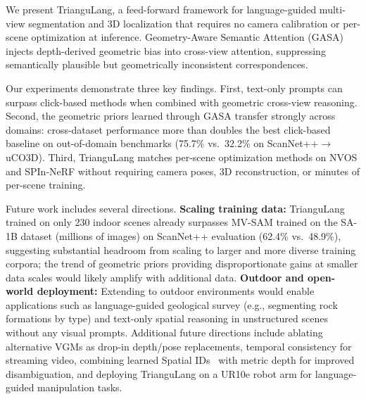 \label{sec:conclusion}
We present TrianguLang, a feed-forward framework for language-guided multi-view segmentation and 3D localization that requires no camera calibration or per-scene optimization at inference. Geometry-Aware Semantic Attention (GASA) injects depth-derived geometric bias into cross-view attention, suppressing semantically plausible but geometrically inconsistent correspondences.

Our experiments demonstrate three key findings. First, text-only prompts can surpass click-based methods when combined with geometric cross-view reasoning. Second, the geometric priors learned through GASA transfer strongly across domains: cross-dataset performance more than doubles the best click-based baseline on out-of-domain benchmarks (75.7\% vs.\ 32.2\% on ScanNet++$\to$uCO3D). Third, TrianguLang matches per-scene optimization methods on NVOS and SPIn-NeRF without requiring camera poses, 3D reconstruction, or minutes of per-scene training.


Future work includes several directions. \textbf{Scaling training data:} TrianguLang trained on only 230 indoor scenes already surpasses MV-SAM trained on the SA-1B dataset (millions of images) on ScanNet++ evaluation (62.4\% vs.\ 48.9\%), suggesting substantial headroom from scaling to larger and more diverse training corpora; the trend of geometric priors providing disproportionate gains at smaller data scales would likely amplify with additional data. \textbf{Outdoor and open-world deployment:} Extending to outdoor environments \cite{dl3dv} would enable applications such as language-guided geological survey (e.g., segmenting rock formations by type) and text-only spatial reasoning in unstructured scenes without any visual prompts. Additional future directions include ablating alternative VGMs as drop-in depth/pose replacements, temporal consistency for streaming video, combining learned Spatial IDs~\cite{spatialids2026} with metric depth for improved disambiguation, and deploying TrianguLang on a UR10e robot arm for language-guided manipulation tasks.
